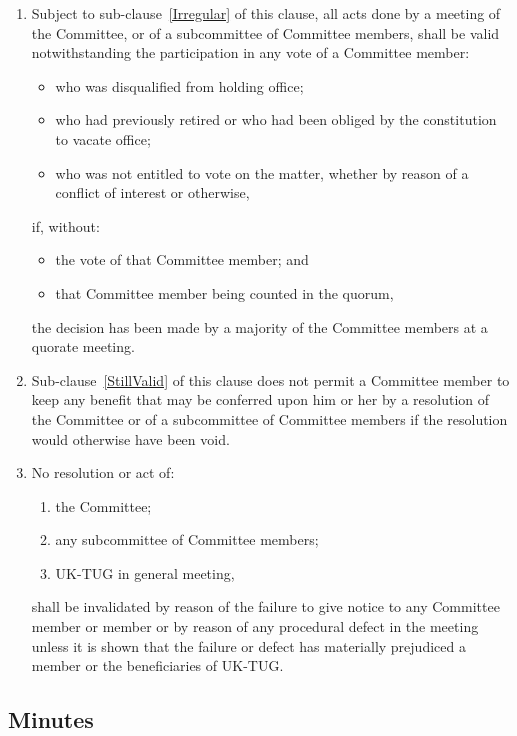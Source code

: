 \documentclass[a4paper,11pt]{article}
\begin{document}
\begin{enumerate}
\item \label{StillValid} Subject to sub-clause~\ref{Irregular} of this clause, all acts done by a meeting of
  the Committee, or of a subcommittee of Committee members, shall be valid
  notwithstanding the participation in any vote of a Committee member:
\begin{itemize}
\item who was disqualified from holding office;
\item who had previously retired or who had been obliged by the constitution to
  vacate office;
\item who was not entitled to vote on the matter, whether by reason of a
  conflict of interest or otherwise,
\end{itemize}
if, without:
\begin{itemize}
\item the vote of that Committee member; and
\item that Committee member being counted in the quorum,
\end{itemize}
the decision has been made by a majority of the Committee members at a quorate
meeting.
\item \label{Irregular} Sub-clause~\ref{StillValid} of this clause does not permit a Committee member to keep
  any benefit that may be conferred upon him or her by a resolution of the
  Committee or of a subcommittee of Committee members if the resolution would
  otherwise have been void.
\item No resolution or act of:
\begin{enumerate}
\item the Committee;
\item any subcommittee of Committee members;
\item UK-TUG in general meeting,
\end{enumerate}
shall be invalidated by reason of the failure to give notice to any Committee
member or member or by reason of any procedural defect in the meeting unless it
is shown that the failure or defect has materially prejudiced a member or the
beneficiaries of UK-TUG.
\end{enumerate}

\subsection{Minutes}
\label{Minutes}
\end{document}
